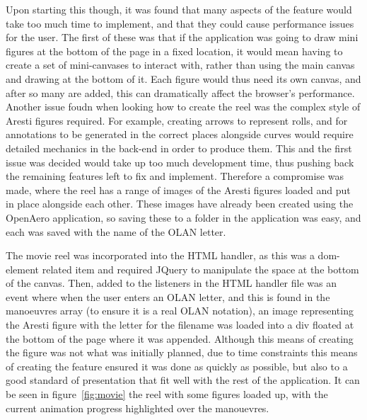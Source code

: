 Upon starting this though, it was found that many aspects of the feature would take too much time to implement, and that they could cause performance issues for the user. The first of these was that if the application was going to draw mini figures at the bottom of the page in a fixed location, it would mean having to create a set of mini-canvases to interact with, rather than using the main canvas and drawing at the bottom of it. Each figure would thus need its own canvas, and after so many are added, this can dramatically affect the browser's performance. Another issue foudn when looking how to create the reel was the complex style of Aresti figures required. For example, creating arrows to represent rolls, and for annotations to be generated in the correct places alongside curves would require detailed mechanics in the back-end in order to produce them. This and the first issue was decided would take up too much development time, thus pushing back the remaining features left to fix and implement. Therefore a compromise was made, where the reel has a range of images of the Aresti figures loaded and put in place alongside each other. These images have already been created using the OpenAero application, so saving these to a folder in the application was easy, and each was saved with the name of the OLAN letter. 

The movie reel was incorporated into the HTML handler, as this was a dom-element related item and required JQuery to manipulate the space at the bottom of the canvas. Then, added to the listeners in the HTML handler file was an event where when the user enters an OLAN letter, and this is found in the manoeuvres array (to ensure it is a real OLAN notation), an image representing the Aresti figure with the letter for the filename was loaded into a div floated at the bottom of the page where it was appended. Although this means of creating the figure was not what was initially planned, due to time constraints this means of creating the feature ensured it was done as quickly as possible, but also to a good standard of presentation that fit well with the rest of the application. It can be seen in figure~\ref{fig:movie} the reel with some figures loaded up, with the current animation progress highlighted over the manouevres.

\clearpage 

